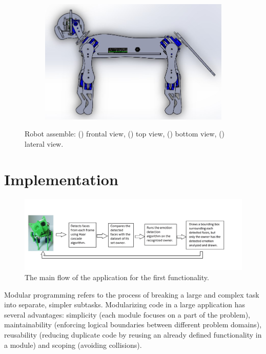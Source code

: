 \documentclass[runningheads,a4paper,12pt]{report}
\begin{document}
\begin{figure}[H]
  	\begin{subfigure}{0.5\textwidth}
  		\centering
  		\includegraphics[width=\linewidth]{./images/3_hard_lateral}
  		\caption{}
  		\label{fig:3_lateral}
  	\end{subfigure}
  	\caption{Robot assemble: 
  		() frontal view,
  		() top view,
  		() bottom view,
  		() lateral view.
  		}
  	\label{fig:3_hardware2}
\end{figure}

\newpage

\section{Implementation}
\label{chapter:implementation}

\begin{figure}
	\centering

  	\includegraphics[width=\linewidth]{./images/3_flow}\hfill

    \caption{The main flow of the application for the first functionality.}  
    \label{fig:flow}
\end{figure}

Modular programming refers to the process of breaking a large and complex task into separate, simpler subtasks. Modularizing code in a large application has several advantages: simplicity (each module focuses on a part of the problem), maintainability (enforcing logical boundaries between different problem domains), reusability (reducing duplicate code by reusing an already defined functionality in a module) and scoping (avoiding collisions). 
\end{document}
